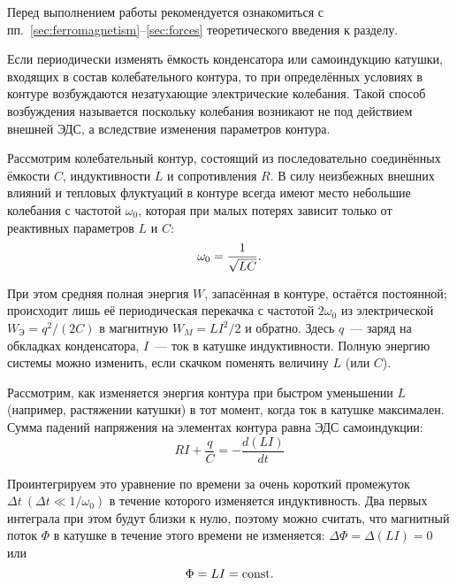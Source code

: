 


Перед выполнением работы рекомендуется ознакомиться с
пп.~\ref{sec:ferromagnetism}--\ref{sec:forces} теоретического
введения к разделу.

Если периодически изменять ёмкость конденсатора или самоиндукцию катушки,
входящих в состав колебательного контура, то при определённых условиях в контуре
возбуждаются незатухающие электрические колебания. Такой способ возбуждения
называется  поскольку колебания возникают не под
действием внешней ЭДС, а вследствие изменения параметров контура.

Рассмотрим колебательный контур, состоящий из последовательно соединённых
ёмкости $C$, индуктивности $L$ и сопротивления $R$. В силу неизбежных внешних
влияний и тепловых флуктуаций в контуре всегда имеют место небольшие колебания с
частотой $\omega_0$, которая при малых потерях зависит только от реактивных
параметров $L$ и $C$:
\begin{equation}
	\eqmark{4.6.1}
	 \omega_0 = \frac{1}{\sqrt{LC}}.
\end{equation}

При этом средняя полная энергия $W$, запасённая в контуре, остаётся постоянной;
происходит лишь её периодическая перекачка с частотой $2\omega_0$ из
электрической $W_\text{Э} = q^2 / (2C)$ в магнитную $W_M = LI^2/2$ и обратно.
Здесь $q$~--- заряд на обкладках конденсатора, $I$~--- ток в катушке
индуктивности. Полную энергию системы можно изменить, если скачком поменять
величину $L$ (или $C$).

 Рассмотрим, как изменяется энергия контура при быстром уменьшении $L$
(например, растяжении катушки) в тот момент, когда ток в катушке максимален.
Сумма падений напряжения на элементах контура равна ЭДС самоиндукции:
\begin{equation*}
	RI + \frac{q}{C}= - \frac{d(LI)}{dt}
\end{equation*}

Проинтегрируем это уравнение по времени за очень короткий промежуток $\Delta t
~(\Delta t \ll 1/\omega_0)$ в течение которого изменяется индуктивность. Два
первых интеграла при этом будут близки к нулю, поэтому можно считать, что
магнитный поток $\Phi$ в катушке в течение этого времени не изменяется:
$\Delta \Phi=\Delta (LI) = 0$ или
\begin{equation}
	\eqmark{4.6.2}
	\Phi=LI =\const.
\end{equation}

